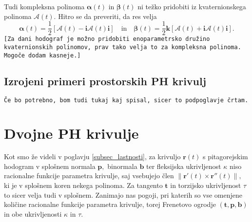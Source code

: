 \documentclass[12pt,a4paper,twoside]{article}
\theoremstyle{definition} %
\theoremstyle{plain} %
\numberwithin{equation}{section}  %
\newcommand{\tV}{\mathbf{t}}
\newcommand{\bV}{\mathbf{b}}
\newcommand{\pV}{\mathbf{p}}
\newcommand{\rV}{\mathbf{r}}
\newcommand{\iV}{\mathbf{i}}
\newcommand{\kV}{\mathbf{k}}
\newcommand{\AQ}{\mathcal{A}}
\newcommand{\balpha}{\boldsymbol \alpha}
\newcommand{\bbeta}{\boldsymbol \beta}
\begin{document}
Tudi kompleksna polinoma $\balpha(t)$ in $\bbeta(t)$ ni težko pridobiti iz kvaternionskega polinoma $\AQ(t).$ Hitro se da preveriti, da res velja
\begin{equation}
	\label{quat_to_comp}
		\balpha(t) = \frac{1}{2}[\AQ(t)-\iV\AQ(t)\iV] \quad \text{in} \quad \bbeta(t)= \frac{1}{2}\kV[\AQ(t)+\iV\AQ(t)\iV].
\end{equation}
\texttt{[Za dani hodograf je možno pridobiti enoparametrsko družino kvaternionskih polinomov, prav tako velja to za kompleksna polinoma. Mogoče dodam kasneje.]}

\subsection{Izrojeni primeri prostorskih PH krivulj}

\texttt{Če bo potrebno, bom tudi tukaj kaj spisal, sicer to podpoglavje črtam.}

\section{Dvojne PH krivulje}

Kot smo že videli v poglavju \ref{subsec_lastnosti}, za krivuljo $\rV(t)$ s pitagorejskim hodogram v splošnem normala $\pV,$ binormala $\bV$ ter fleksijska ukrivljenost $\kappa$ niso racionalne funkcije parametra krivulje, saj vsebujejo člen $\lVert \rV'(t) \times \rV''(t) \rVert,$ ki je v splošnem koren nekega polinoma. Za tangento $\tV$ in torzijsko ukrivljenost $\tau$ to sicer velja tudi v splošnem. Zanimajo nas pogoji, pri katerih so vse omenjene količine racionalne funkcije parametra krivulje, torej Frenetovo ogrodje $(\tV,\pV,\bV)$ in obe ukrivljenosti $\kappa$ in $\tau.$
\end{document}
